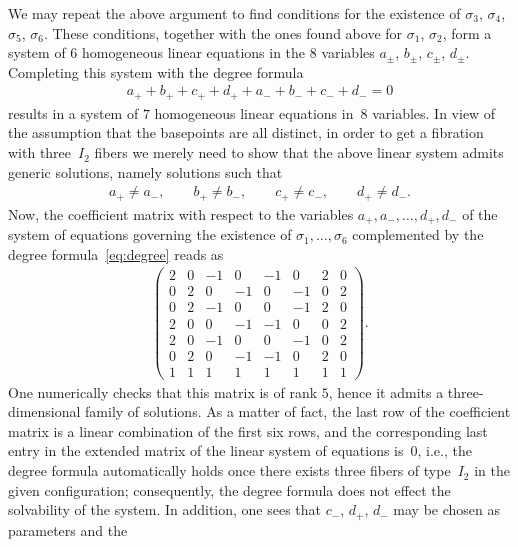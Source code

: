 \documentclass[10pt,a4paper]{amsart}
\numberwithin{equation}{section}
\begin{document}
\begin{Example}
We may repeat the above argument
to find conditions for the existence of $\sigma_3$, $\sigma_4$, $\sigma_5$, $\sigma_6$. These conditions, together with the ones found above for $\sigma_1$, $\sigma_2$, form a system of $6$ homogeneous linear equations in the $8$ variables $a_{\pm}$, $b_{\pm}$, $c_{\pm}$, $d_{\pm}$. Completing this system with the degree formula
\begin{gather}\label{eq:degree}
 a_+ + b_+ + c_+ + d_+ + a_- + b_- + c_- + d_- = 0
\end{gather}
results in a system of $7$ homogeneous linear equations in~$8$ variables. In view of the assumption that the basepoints are all distinct, in order to get a fibration with three~$I_2$ fibers we merely need to show that the above linear system admits generic solutions, namely solutions such that
\begin{gather}\label{eq:generic}
 a_+ \neq a_-, \qquad b_+ \neq b_-, \qquad c_+ \neq c_-, \qquad d_+ \neq d_-.
\end{gather}
Now,  the coefficient matrix with respect to the variables $a_+, a_-, \ldots, d_+, d_-$ of the system of equations governing the existence of
$\sigma_1, \ldots , \sigma_6$ complemented by the degree formula~\eqref{eq:degree} reads as
\begin{gather*}
 \begin{pmatrix}
 2 & 0 & -1 & 0 & -1 & 0 & 2 & 0 \\
 0 & 2 & 0 & -1 & 0 & -1 & 0 & 2 \\
 0 & 2 & -1 & 0 & 0 & -1 & 2 & 0 \\
 2 & 0 & 0 & -1 & -1 & 0 & 0 & 2 \\
 2 & 0 & -1 & 0 & 0 & -1 & 0 & 2\\
 0 & 2 & 0 & -1 & -1 & 0 & 2 & 0\\
 1 & 1 & 1 & 1 & 1 & 1 & 1 & 1
 \end{pmatrix}.
\end{gather*}
One numerically checks that this matrix is of rank $5$, hence it
 admits a three-dimensional family of solutions. As a matter of
 fact, the last row of the coefficient matrix is a linear combination
 of the first six rows, and the corresponding last entry in the
 extended matrix of the linear system of equations is~$0$, i.e., the
 degree formula automatically holds once there exists three fibers of
 type~$I_2$ in the given configuration; consequently, the degree
 formula does not effect the solvability of the system. In addition,
 one sees that $c_-$, $d_+$, $d_-$ may be chosen as parameters and the

\end{Example}
\end{document}
